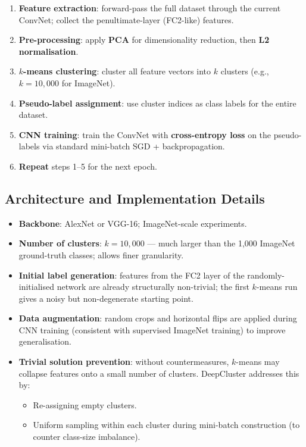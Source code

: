 \documentclass[11pt,a4paper]{article}
\theoremstyle{definition}
\theoremstyle{plain}
\theoremstyle{remark}
\begin{document}
\begin{tcolorbox}[colback=green!5!white,colframe=green!60!black,title=\textbf{DeepCluster Pipeline}]
\begin{enumerate}
    \item \textbf{Feature extraction}: forward-pass the full dataset through the current ConvNet; collect the penultimate-layer (FC2-like) features.
    \item \textbf{Pre-processing}: apply \textbf{PCA} for dimensionality reduction, then \textbf{L2 normalisation}.
    \item \textbf{$k$-means clustering}: cluster all feature vectors into $k$ clusters (e.g., $k = 10{,}000$ for ImageNet).
    \item \textbf{Pseudo-label assignment}: use cluster indices as class labels for the entire dataset.
    \item \textbf{CNN training}: train the ConvNet with \textbf{cross-entropy loss} on the pseudo-labels via standard mini-batch SGD + backpropagation.
    \item \textbf{Repeat} steps 1--5 for the next epoch.
\end{enumerate}
\end{tcolorbox}

\subsection{Architecture and Implementation Details}

\begin{itemize}
    \item \textbf{Backbone}: AlexNet or VGG-16; ImageNet-scale experiments.
    \item \textbf{Number of clusters}: $k = 10{,}000$ --- much larger than the 1{,}000 ImageNet ground-truth classes; allows finer granularity.
    \item \textbf{Initial label generation}: features from the FC2 layer of the randomly-initialised network are already structurally non-trivial; the first $k$-means run gives a noisy but non-degenerate starting point.
    \item \textbf{Data augmentation}: random crops and horizontal flips are applied during CNN training (consistent with supervised ImageNet training) to improve generalisation.
    \item \textbf{Trivial solution prevention}: without countermeasures, $k$-means may collapse features onto a small number of clusters. DeepCluster addresses this by:
    \begin{itemize}
        \item Re-assigning empty clusters.
        \item Uniform sampling within each cluster during mini-batch construction (to counter class-size imbalance).
    \end{itemize}
\end{itemize}
\end{document}
